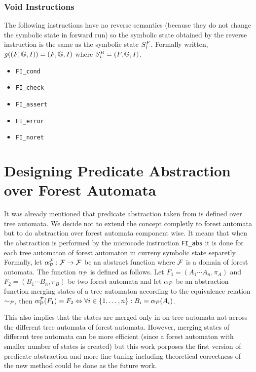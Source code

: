 \subsubsection{Void Instructions}
The following instructions have no reverse semantics
(because they do not change the symbolic state in forward run)
so the symbolic state obtained by the reverse instruction
is the same as the symbolic state $S^{F}_{i}$.
Formally written, $g((F, \mathbb{G}, I)) = (F, \mathbb{G}, I)$ where $S^{B}_{i} = (F, \mathbb{G}, I)$.

\begin{itemize}
	
	\item {\tt FI\_cond}
	
	\item {\tt FI\_check}
	
	\item {\tt FI\_assert}
	
	\item {\tt FI\_error}
	
	\item {\tt FI\_noret}

\end{itemize}


\section{Designing Predicate Abstraction over Forest Automata}
\label{sec:padesign}

It was already mentioned that predicate abstraction taken from \cite{artmc}
is defined over tree automata.
We decide not to extend the concept completly to forest automata but
to do abstraction over forest automata component wise.
It means that when the abstraction is performed by the microcode instruction
{\tt FI\_abs} it is done for each tree automaton of forest automaton in curreny symbolic
state separetly.
Formally, let $\alpha_{\mathcal{P}}^{\mathcal{F}}: \mathcal{F} \rightarrow \mathcal{F}$ be an abstract function where
$\mathcal{F}$ is a domain of forest automata.
The function $\alpha_{\mathcal{P}}$ is defined as follows.
Let $F_1=(A_1 \cdots A_n, \pi_A)$ and $F_2=(B_1 \cdots B_n, \pi_B)$ be two forest automata
and let $\alpha_{\mathcal{P}}$ be an abstraction function merging states of a tree automaton according
to the equivalence relation $\sim_{\mathcal{P}}$,
then $\alpha_{\mathcal{P}}^{\mathcal{F}}(F_1) = F_2 \Leftrightarrow \forall i \in \{1,\ldots,n\}: B_i = \alpha_{\mathcal{P}}(A_i)$.

This also implies that the states are merged only in on tree automata not across the different
tree automata of forest automata.
However, merging states of different tree automata can be more efficient (since
a forest automaton with smaller number of states is created) but this
work porposes the first version of predicate abstraction and more
fine tuning including theoretical correctness of the new method could
be done as the future work.

